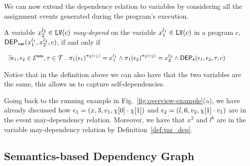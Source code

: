 We can now extend the dependency relation to variables by considering all the assignment events generated during the program's execution. 
\begin{defn}
  \label{def:var_dep}
A variable ${x}_2^{l_2} \in \mathtt{LV}(c)$  \emph{may-depend} on the 
  variable ${x}_1^{l_1} \in \mathtt{LV}(c)$ in a program ${c}$,
  $\mathsf{DEP_{var}}({x}_1^{l_1}, {x}_2^{l_2}, {c})$, if and only if
\begin{center}
$
{\small   \begin{array}{l}
\exists \event_1, \event_2 \in \eventset^{\asn}, \trace \in \mathcal{T} \st
\pi_{1}{(\event_1)}^{\pi_{2}{(\event_1)}} = {x}_1^{l_1}
\land
\pi_{1}{(\event_2)}^{\pi_{2}{(\event_2)}} = {x}_2^{l_2}%
\land 
\eventdep(\event_1, \event_2, \trace, c) 
  \end{array}
}%
$
\end{center}
  \end{defn}
Notice that in the definition above we can also have that the two variables are the same, this allows us to capture self-dependencies.

Going back to the running example in Fig.~\ref{fig:overview-example}(a), we have already discussed how  $\mathtt{\epsilon}_1 = (x, 3, v_1, \chi[0] \cdot \chi[1])$ and $\mathtt{\epsilon}_2 = (l, 6, v_2, \chi[1] \cdot v_1 )$ are in the event may-dependency relation. Moreover, we have that $x^3$ and $l^6$ are in the variable may-dependency relation by Definition~\ref{def:var_dep}.

\subsection{Semantics-based Dependency Graph}
\label{sec:design_choice}


